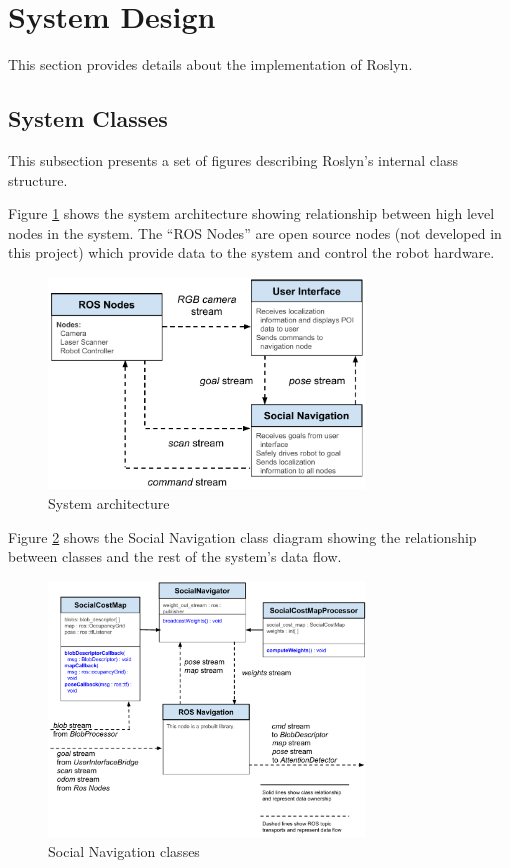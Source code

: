 \documentclass[11pt]{report}
\begin{document}
\section{System Design}
This section provides details about the implementation of Roslyn.

\subsection{System Classes}
This subsection presents a set of figures describing Roslyn's internal class structure.

Figure \ref{fig:system_class_overview} shows the system architecture showing relationship between high level nodes in the system. The “ROS Nodes” are open source nodes (not developed in this project) which provide data to the system and control the robot hardware.
\begin{figure}[H]
 \centering
 \includegraphics[width=0.75\textwidth]{system_class_overview.pdf}
 \caption{System architecture}
 \label{fig:system_class_overview}
\end{figure}

Figure \ref{fig:social_navigation} shows the Social Navigation class diagram showing the relationship between classes and the rest of the system's data flow.
\begin{figure}[H]
 \centering
 \includegraphics[width=0.75\textwidth]{social_navigation.pdf}
 \caption{Social Navigation classes}
 \label{fig:social_navigation}
\end{figure}
\end{document}
